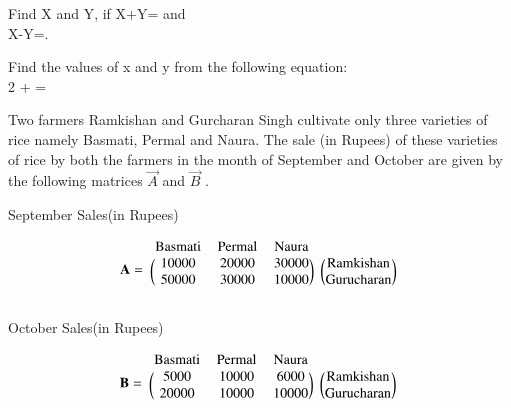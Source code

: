    \item Find X and Y, if X+Y= and \\X-Y=.\\
    \item Find the values of x and y from the following equation:\\
    2 +  = \\
     
    

\item     Two farmers Ramkishan and Gurcharan Singh cultivate only three varieties of rice namely Basmati, Permal and Naura. The sale (in Rupees) of these varieties of rice by both the farmers in the month of September and October are given by the following matrices $\vec{A}$ and $\vec{B}$ .

\begin{center}
September Sales(in Rupees)
\end{center}
\begin{align}
    \vec{A}=
    \begin{blockarray}{cccc}
    \text{Basmati} & \text{Permal} & \text{Naura} \\
    \begin{block}{(ccc)(c)}
    10000 & 20000 & 30000 & \text{Ramkishan}\\
    50000 & 30000 & 10000 & \text{Gurucharan} \\
    \end{block}
    \end{blockarray}
\end{align}

\begin{center}
October Sales(in Rupees)
\end{center}
\begin{align}
    \vec{B} =
    \begin{blockarray}{cccc}
    \text{Basmati} & \text{Permal} & \text{Naura} \\
    \begin{block}{(ccc)(c)}
    5000 & 10000 & 6000 & \text{Ramkishan}\\
    20000 & 10000 & 10000 & \text{Gurucharan} \\
    \end{block}
    \end{blockarray}
\end{align}

